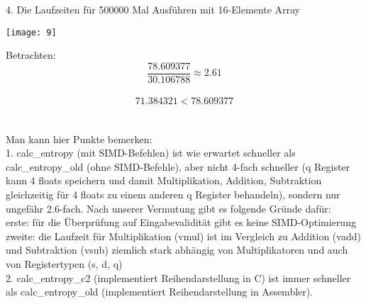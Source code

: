 \documentclass[11pt]{article}
\begin{document}
{{{\begin{large}
4.	Die Laufzeiten f\"ur 500000 Mal Ausf\"uhren mit 16-Elemente Array\\
\centerline  {\texttt{[image: 9]} }
Betrachten: $$\frac{78.609377}{30.106788}\approx 2.61$$\\
                     $$ 71.384321 < 78.609377$$\\\\
Man kann hier Punkte bemerken:\\
{\Large 1.}	calc\_entropy (mit SIMD-Befehlen) ist wie erwartet schneller als calc\_entropy\_old (ohne SIMD-Befehle), aber nicht 4-fach schneller (q Register kann 4 floats speichern und damit Multiplikation, Addition, Subtraktion gleichzeitig f\"ur 4 floats zu einem anderen q Register behandeln), sondern nur ungef\"ahr 2.6-fach. Nach unserer Vermutung gibt es folgende Gr\"unde daf\"ur:\\
erste: f\"ur die \"Uberpr\"ufung auf Eingabevalidit\"at gibt es keine SIMD-Optimierung
zweite: die Laufzeit f\"ur Multiplikation (vmul) ist im Vergleich zu Addition (vadd) und 
              Subtraktion (vsub) ziemlich stark abh\"angig von Multiplikatoren und auch von 
              Registertypen (s, d, q)\\
{\Large 2.	}calc\_entropy\_c2 (implementiert Reihendarstellung in C) ist immer schneller als calc\_entropy\_old (implementiert Reihendarstellung in Assembler).\\\\

\end{large}}}}
\end{document}
